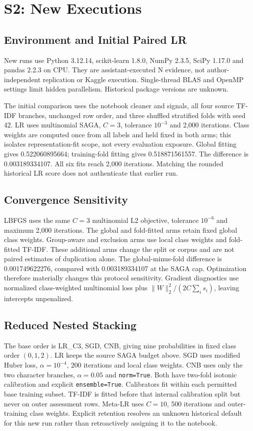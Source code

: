 \documentclass[doublecolumn]{ijcvsplatex}
\begin{document}
\section{S2: New Executions}
\subsection{Environment and Initial Paired LR}
New runs use Python 3.12.14, scikit-learn 1.8.0, NumPy 2.3.5, SciPy 1.17.0 and pandas 2.2.3 on CPU. They are assistant-executed N evidence, not author-independent replication or Kaggle execution. Single-thread BLAS and OpenMP settings limit hidden parallelism. Historical package versions are unknown.

The initial comparison uses the notebook cleaner and signals, all four source TF-IDF branches, unchanged row order, and three shuffled stratified folds with seed 42. LR uses multinomial SAGA, $C=3$, tolerance $10^{-3}$ and 2,000 iterations. Class weights are computed once from all labels and held fixed in both arms; this isolates representation-fit scope, not every evaluation exposure. Global fitting gives 0.522060895664; training-fold fitting gives 0.518871561557. The difference is 0.003189334107. All six fits reach 2,000 iterations. Matching the rounded historical LR score does not authenticate that earlier run.

\subsection{Convergence Sensitivity}
LBFGS uses the same $C=3$ multinomial L2 objective, tolerance $10^{-6}$ and maximum 2,000 iterations. The global and fold-fitted arms retain fixed global class weights. Group-aware and exclusion arms use local class weights and fold-fitted TF-IDF. These additional arms change the split or corpus and are not paired estimates of duplication alone. The global-minus-fold difference is 0.001749622276, compared with 0.003189334107 at the SAGA cap. Optimization therefore materially changes this protocol sensitivity. Gradient diagnostics use normalized class-weighted multinomial loss plus $\|W\|_2^2/(2C\sum_i s_i)$, leaving intercepts unpenalized.



\subsection{Reduced Nested Stacking}
The base order is LR\_C3, SGD, CNB, giving nine probabilities in fixed class order $(0,1,2)$. LR keeps the source SAGA budget above. SGD uses modified Huber loss, $\alpha=10^{-4}$, 200 iterations and local class weights. CNB uses only the two character branches, $\alpha=0.05$ and \texttt{norm=True}. Both have two-fold isotonic calibration and explicit \texttt{ensemble=True}. Calibrators fit within each permitted base training subset. TF-IDF is fitted before that internal calibration split but never on outer assessment rows. Meta-LR uses $C=10$, 500 iterations and outer-training class weights. Explicit retention resolves an unknown historical default for this new run rather than retroactively assigning it to the notebook.
\end{document}
